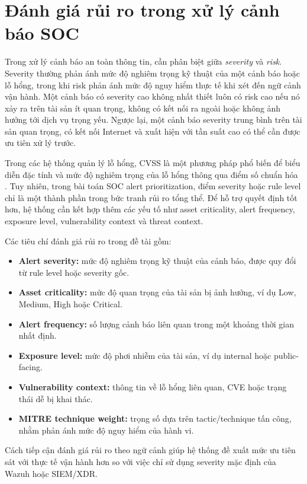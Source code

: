 \documentclass[a4paper,12pt,oneside]{book}
\begin{document}
\section{Đánh giá rủi ro trong xử lý cảnh báo SOC}
{\fontsize{13pt}{15.6pt}\selectfont

Trong xử lý cảnh báo an toàn thông tin, cần phân biệt giữa \textit{severity} và \textit{risk}. Severity thường phản ánh mức độ nghiêm trọng kỹ thuật của một cảnh báo hoặc lỗ hổng, trong khi risk phản ánh mức độ nguy hiểm thực tế khi xét đến ngữ cảnh vận hành. Một cảnh báo có severity cao không nhất thiết luôn có risk cao nếu nó xảy ra trên tài sản ít quan trọng, không có kết nối ra ngoài hoặc không ảnh hưởng tới dịch vụ trọng yếu. Ngược lại, một cảnh báo severity trung bình trên tài sản quan trọng, có kết nối Internet và xuất hiện với tần suất cao có thể cần được ưu tiên xử lý trước.

\noindent Trong các hệ thống quản lý lỗ hổng, CVSS là một phương pháp phổ biến để biểu diễn đặc tính và mức độ nghiêm trọng của lỗ hổng thông qua điểm số chuẩn hóa \cite{firstCVSS40}. Tuy nhiên, trong bài toán SOC alert prioritization, điểm severity hoặc rule level chỉ là một thành phần trong bức tranh rủi ro tổng thể. Để hỗ trợ quyết định tốt hơn, hệ thống cần kết hợp thêm các yếu tố như asset criticality, alert frequency, exposure level, vulnerability context và threat context.

\noindent Các tiêu chí đánh giá rủi ro trong đề tài gồm:

\begin{itemize}
    \item \textbf{Alert severity:} mức độ nghiêm trọng kỹ thuật của cảnh báo, được quy đổi từ rule level hoặc severity gốc.
    \item \textbf{Asset criticality:} mức độ quan trọng của tài sản bị ảnh hưởng, ví dụ Low, Medium, High hoặc Critical.
    \item \textbf{Alert frequency:} số lượng cảnh báo liên quan trong một khoảng thời gian nhất định.
    \item \textbf{Exposure level:} mức độ phơi nhiễm của tài sản, ví dụ internal hoặc public-facing.
    \item \textbf{Vulnerability context:} thông tin về lỗ hổng liên quan, CVE hoặc trạng thái dễ bị khai thác.
    \item \textbf{MITRE technique weight:} trọng số dựa trên tactic/technique tấn công, nhằm phản ánh mức độ nguy hiểm của hành vi.
\end{itemize}

\noindent Cách tiếp cận đánh giá rủi ro theo ngữ cảnh giúp hệ thống đề xuất mức ưu tiên sát với thực tế vận hành hơn so với việc chỉ sử dụng severity mặc định của Wazuh hoặc SIEM/XDR.

}
\end{document}
